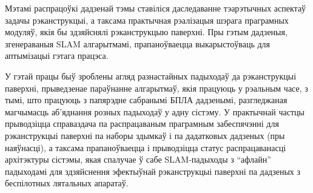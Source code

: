 Мэтамі распрацоўкі дадзенай тэмы ставіліся даследаванне тэарэтычных аспектаў задачы
рэканструкцыі, а таксама практычная рэалізацыя шэрага праграмных модуляў, якія бы
здзяйснялі рэканструкцыю паверхні. Пры гэтым дадзеныя, згенераваныя SLAM
алгарытмамі, прапаноўваецца выкарыстоўваць для аптымізацыі гэтага працэса.

У гэтай працы быў зроблены агляд разнастайных падыходаў да рэканструкцыі паверхні,
прыведзенае параўнанне алгарытмаў, якія працуюць у рэальным часе, з тымі, што працуюць
з папярэдне сабранымі БПЛА дадзенымі, разгледжаная магчымасць аб'яднання
розных падыходаў у адну сістэму. У практычнай частцы прыводзіцца справаздача па распрацаваным
праграмным забеспячэнні для рэканструкцыі паверхні па наборы здымкаў і па дадатковых дадзеных (пры наяўнасці),
а таксама прапаноўваецца і прыводзіцца статус распрацаванасці архітэктуры сістэмы,
якая спалучае ў сабе SLAM-падыходы з ``афлайн'' падыходамі для
здзяйснення эфектыўнай рэканструкцыі паверхні па дадзеных з беспілотных лятальных апаратаў.

\newpage
